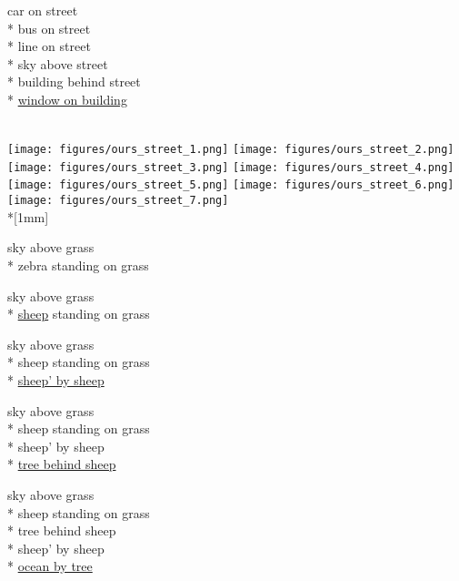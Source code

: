 \documentclass[10pt,twocolumn,letterpaper]{article}
\begin{document}
\begin{figure*}[ht]
\begin{minipage}{\progsize}
    car on street \\*
    bus on street \\*
    line on street \\*
    sky above street \\*
    building behind street \\*
    \underline{window on building}
  \end{minipage} \\
  \texttt{[image: figures/ours\_street\_1.png]}
  \texttt{[image: figures/ours\_street\_2.png]}
  \texttt{[image: figures/ours\_street\_3.png]}
  \texttt{[image: figures/ours\_street\_4.png]}
  \texttt{[image: figures/ours\_street\_5.png]}
  \texttt{[image: figures/ours\_street\_6.png]}
  \texttt{[image: figures/ours\_street\_7.png]} \\*[1mm]
  \begin{minipage}{\progsize}
    \centering
    \scriptsize
    sky above grass \\*
    zebra standing on grass
  \end{minipage}
  \begin{minipage}{\progsize}
    \centering
    \scriptsize
    sky above grass \\*
    \underline{sheep} standing on grass
  \end{minipage}
  \begin{minipage}{\progsize}
    \centering
    \scriptsize
    sky above grass \\*
    sheep standing on grass \\*
    \underline{sheep' by sheep}
  \end{minipage}
  \begin{minipage}{\progsize}
    \centering
    \ssmall
    sky above grass \\*
    sheep standing on grass \\*
    sheep' by sheep \\*
    \underline{tree behind sheep}
  \end{minipage}
  \begin{minipage}{\progsize}
    \centering
    \ssmall
    sky above grass \\*
    sheep standing on grass \\*
    tree behind sheep \\*
    sheep' by sheep \\*
    \underline{ocean by tree}
  \end{minipage}

\end{figure*}
\end{document}

